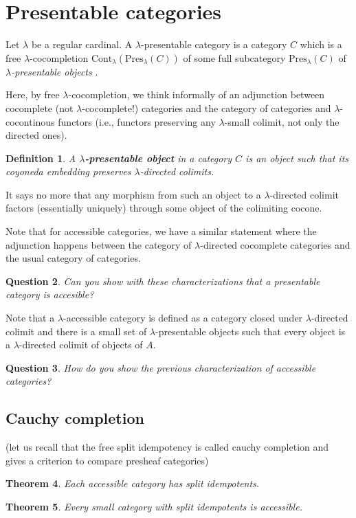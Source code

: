 \documentclass{article}
\newcommand{\Cont}[1]{\text{Cont}_{#1}}
\newcommand{\Pres}[1]{\text{Pres}_{#1}}
\newtheorem{theorem}{Theorem}[section]
\newtheorem{definition}[theorem]{Definition}
\newtheorem{question}[theorem]{Question}
\begin{document}
  \section{Presentable categories}
  Let $\lambda$ be a regular cardinal. A $\lambda$-presentable category is a
  category $C$ which is a free $\lambda$-cocompletion
  $\Cont\lambda(\Pres\lambda(C))$ of
  some full subcategory $\Pres\lambda(C)$ of \emph{$\lambda$-presentable
    objects} \cite[Representation theorem 1.46]{adamek_rosicky}.

  Here, by free $\lambda$-cocompletion, we think informally of an adjunction between
  cocomplete (not $\lambda$-cocomplete!) categories and the category of
  categories and $\lambda$-cocontinous functors (i.e., functors preserving any
  $\lambda$-small colimit, not only the directed ones).

  \begin{definition}
    A \textbf{$\lambda$-presentable object} in a category $C$ is an object such
    that its coyoneda embedding preserves $\lambda$-directed colimits.
  \end{definition}
  It says no more that any morphism from such an object to a $\lambda$-directed
  colimit factors (essentially uniquely) through some object of the colimiting cocone.

  Note that for accessible categories, we have a similar statement
  \cite[2.26]{adamek_rosicky} where the adjunction happens between the category
  of $\lambda$-directed cocomplete categories and the usual category of categories.
  \begin{question}
   Can you show with these characterizations that a presentable category is
   accesible? 
  \end{question}
  Note that a $\lambda$-accessible category is defined as a category closed
  under $\lambda$-directed colimit and there is a small set of
  $\lambda$-presentable objects such that every object is a $\lambda$-directed
  colimit of objects of $A$.
  \begin{question}
    How do you show the previous characterization of accessible categories?
\end{question}
\subsection{Cauchy completion}
(let us recall that the free split idempotency is called cauchy completion and
gives a criterion to compare presheaf categories)
\begin{theorem}
  \cite[2.4]{adamek_rosicky}
 Each accessible category has split idempotents. 
\end{theorem}
\begin{theorem}
 Every small category with split idempotents is accessible. 
\end{theorem}
\end{document}

